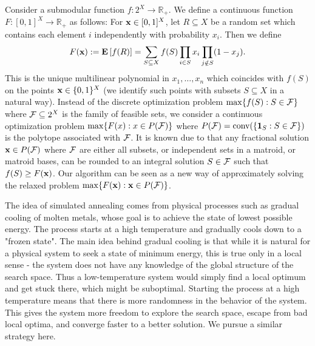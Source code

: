 \documentclass{article}[11pt]
\newtheorem{lemma}[theorem]{Lemma}
\newcommand{\E}[1]{{\bf{E}}\left[#1\right]}
\def\b1{{\bf 1}}
\def\bx{{\bf x}}
\def\RR{{\mathbb R}}
\def\cM{{\cal M}}
\def\cI{{\cal I}}
\def\cF{{\cal F}}
\def\max{{\rm{max}}}
\begin{document}
\medskip
{}
Consider a submodular function $f:2^X \rightarrow \RR_+$. We define a continuous function
$F:[0,1]^X \rightarrow \RR_+$ as follows: For $\bx \in [0,1]^X$, let $R \subseteq X$ be a random
set which contains each element $i$ independently with probability $x_i$. Then we define
$$ F(\bx) := \E{f(R)} = \sum_{S \subseteq X} f(S) \prod_{i \in S} x_i \prod_{j \notin S}
 (1-x_j).$$
This is the unique multilinear polynomial in $x_1,\ldots,x_n$ which coincides with $f(S)$
on the points $\bx \in \{0,1\}^X$ (we identify such points with subsets $S \subseteq X$ in a natural way).
Instead of the discrete optimization problem
$ \max \{f(S): S \in \cF \} $
where $\cF \subseteq 2^X$ is the family of feasible sets,
we consider a continuous optimization problem
$ \max \{F(x): x \in P(\cF) \} $
where $P(\cF) = \mbox{conv}(\{\b1_S: S \in \cF\})$ is the polytope associated with $\cF$.
It is known due to \cite{CCPV07,CCPV09,Vondrak09} that any fractional solution 
$\bx \in P(\cF)$ where $\cF$ are either all subsets, or independent sets in a matroid,
or matroid bases, can be rounded to an integral solution $S \in \cF$ such that
 $f(S) \geq F(\bx)$. 
Our algorithm can be seen as a new way of approximately solving the relaxed
problem $\max \{F(\bx): \bx \in P(\cF) \}$.

\iffalse
\begin{lemma}
\label{lem:pipage-rounding}
For any matroid $\cM = (X,\cI)$, let $P$ be either the matroid polytope (convex hull of independent sets)
or the matroid base polytope (convex hull of bases). Then there is an efficient randomized
rounding technique which for any point $x \in P$ finds a random vertex $\b1_R$ of $P$ such that
$\E{\b1_R} = x$, and for any submodular function $f:2^X \rightarrow \RR$ and its multilinear extension $F$,
$$ \E{f(R)} \geq F(x).$$
\end{lemma}
\fi

\medskip
{}
The idea of simulated annealing comes from physical processes such as gradual cooling of molten metals,
whose goal is to achieve the state of lowest possible energy. The process starts at a high temperature
and gradually cools down to a "frozen state". The main idea behind gradual cooling is that
while it is natural for a physical system to seek a state of minimum energy,
this is true only in a local sense - the system does not have any knowledge of the global structure
of the search space. Thus a low-temperature system would simply find a local optimum and get stuck there,
which might be suboptimal. Starting the process at a high temperature means that there is more randomness
in the behavior of the system. This gives the system more freedom to explore the search space,
escape from bad local optima, and converge faster to a better solution.
We pursue a similar strategy here.
\end{document}
